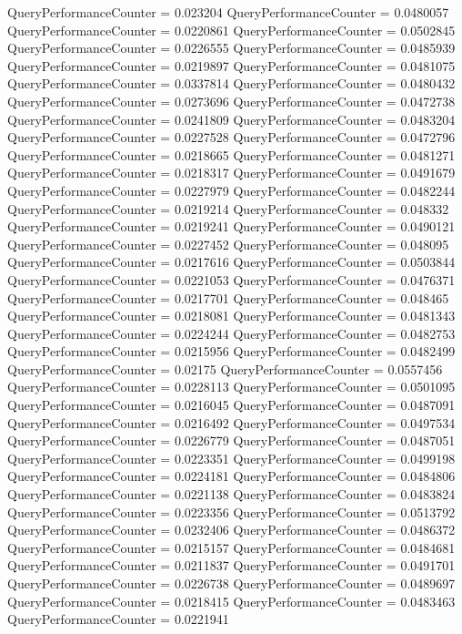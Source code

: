 \documentclass[9pt]{article}
\theoremstyle{plain}
\theoremstyle{definition}
\theoremstyle{remark}
\numberwithin{equation}{section}
\begin{document}
QueryPerformanceCounter  =  0.023204
QueryPerformanceCounter  =  0.0480057
QueryPerformanceCounter  =  0.0220861
QueryPerformanceCounter  =  0.0502845
QueryPerformanceCounter  =  0.0226555
QueryPerformanceCounter  =  0.0485939
QueryPerformanceCounter  =  0.0219897
QueryPerformanceCounter  =  0.0481075
QueryPerformanceCounter  =  0.0337814
QueryPerformanceCounter  =  0.0480432
QueryPerformanceCounter  =  0.0273696
QueryPerformanceCounter  =  0.0472738
QueryPerformanceCounter  =  0.0241809
QueryPerformanceCounter  =  0.0483204
QueryPerformanceCounter  =  0.0227528
QueryPerformanceCounter  =  0.0472796
QueryPerformanceCounter  =  0.0218665
QueryPerformanceCounter  =  0.0481271
QueryPerformanceCounter  =  0.0218317
QueryPerformanceCounter  =  0.0491679
QueryPerformanceCounter  =  0.0227979
QueryPerformanceCounter  =  0.0482244
QueryPerformanceCounter  =  0.0219214
QueryPerformanceCounter  =  0.048332
QueryPerformanceCounter  =  0.0219241
QueryPerformanceCounter  =  0.0490121
QueryPerformanceCounter  =  0.0227452
QueryPerformanceCounter  =  0.048095
QueryPerformanceCounter  =  0.0217616
QueryPerformanceCounter  =  0.0503844
QueryPerformanceCounter  =  0.0221053
QueryPerformanceCounter  =  0.0476371
QueryPerformanceCounter  =  0.0217701
QueryPerformanceCounter  =  0.048465
QueryPerformanceCounter  =  0.0218081
QueryPerformanceCounter  =  0.0481343
QueryPerformanceCounter  =  0.0224244
QueryPerformanceCounter  =  0.0482753
QueryPerformanceCounter  =  0.0215956
QueryPerformanceCounter  =  0.0482499
QueryPerformanceCounter  =  0.02175
QueryPerformanceCounter  =  0.0557456
QueryPerformanceCounter  =  0.0228113
QueryPerformanceCounter  =  0.0501095
QueryPerformanceCounter  =  0.0216045
QueryPerformanceCounter  =  0.0487091
QueryPerformanceCounter  =  0.0216492
QueryPerformanceCounter  =  0.0497534
QueryPerformanceCounter  =  0.0226779
QueryPerformanceCounter  =  0.0487051
QueryPerformanceCounter  =  0.0223351
QueryPerformanceCounter  =  0.0499198
QueryPerformanceCounter  =  0.0224181
QueryPerformanceCounter  =  0.0484806
QueryPerformanceCounter  =  0.0221138
QueryPerformanceCounter  =  0.0483824
QueryPerformanceCounter  =  0.0223356
QueryPerformanceCounter  =  0.0513792
QueryPerformanceCounter  =  0.0232406
QueryPerformanceCounter  =  0.0486372
QueryPerformanceCounter  =  0.0215157
QueryPerformanceCounter  =  0.0484681
QueryPerformanceCounter  =  0.0211837
QueryPerformanceCounter  =  0.0491701
QueryPerformanceCounter  =  0.0226738
QueryPerformanceCounter  =  0.0489697
QueryPerformanceCounter  =  0.0218415
QueryPerformanceCounter  =  0.0483463
QueryPerformanceCounter  =  0.0221941
\end{document}
